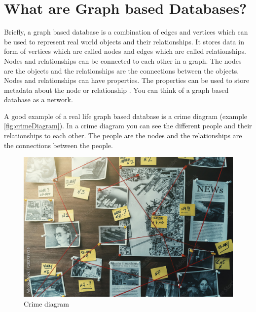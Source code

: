 
\section{What are Graph based Databases?}
Briefly, a graph based database is a combination of edges and vertices which  can be used to represent real world
objects and their relationships.
It stores data in form of vertices which are called nodes and edges which are called relationships.
Nodes and relationships can be connected to each other in a graph.
The nodes are the objects and the relationships are the connections between the objects.
Nodes and relationships can have properties.
The properties can be used to store metadata about the node or relationship \parencite[P. 6f.]{PractivalNeo4j}.
You can think of a graph based database as a network.

A good example of a real life graph based database is a crime diagram (example \autoref{fig:crimeDiagram}).
In a crime diagram you can see the different people and their relationships to each other.
The people are the nodes and the relationships are the connections between the people. \parencite[compare P. 6f.]{BeginningNeo4j}

\begin{figure}[ht]
    \centering
    \includegraphics[width=1\textwidth]{images/crimediagramm.png}
    \caption{Crime diagram \parencite{Neo4j:crimdiagram}}
    \label{fig:crimeDiagram}
\end{figure}

\newpage
